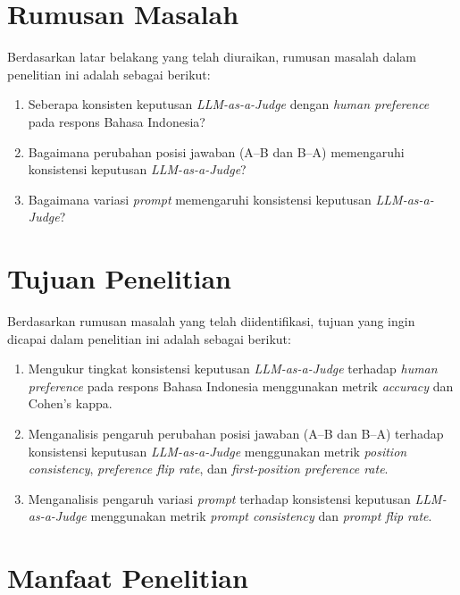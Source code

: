 \section{Rumusan Masalah}

Berdasarkan latar belakang yang telah diuraikan, rumusan masalah dalam penelitian ini adalah sebagai berikut:
\begin{enumerate}
  \item Seberapa konsisten keputusan \textit{LLM-as-a-Judge} dengan \textit{human preference} pada respons Bahasa Indonesia?
  \item Bagaimana perubahan posisi jawaban (A--B dan B--A) memengaruhi konsistensi keputusan \textit{LLM-as-a-Judge}?
  \item Bagaimana variasi \textit{prompt} memengaruhi konsistensi keputusan \textit{LLM-as-a-Judge}?
\end{enumerate}

\section{Tujuan Penelitian}

Berdasarkan rumusan masalah yang telah diidentifikasi, tujuan yang ingin dicapai dalam penelitian ini adalah sebagai berikut:
\begin{enumerate}
  \item Mengukur tingkat konsistensi keputusan \textit{LLM-as-a-Judge} terhadap \textit{human preference} pada respons Bahasa Indonesia menggunakan metrik \textit{accuracy} dan Cohen's kappa.
  \item Menganalisis pengaruh perubahan posisi jawaban (A--B dan B--A) terhadap konsistensi keputusan \textit{LLM-as-a-Judge} menggunakan metrik \textit{position consistency}, \textit{preference flip rate}, dan \textit{first-position preference rate}.
  \item Menganalisis pengaruh variasi \textit{prompt} terhadap konsistensi keputusan \textit{LLM-as-a-Judge} menggunakan metrik \textit{prompt consistency} dan \textit{prompt flip rate}.
\end{enumerate}

\section{Manfaat Penelitian}


